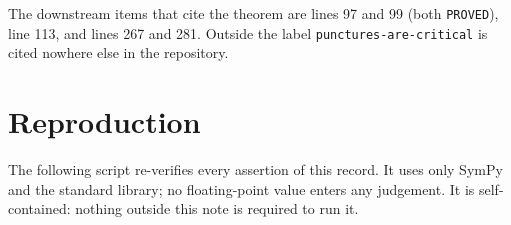 \documentclass[11pt]{article}
\begin{document}
The downstream items that cite the theorem are
 lines 97 and 99 (both
\texttt{PROVED}), line 113, and
 lines 267 and 281.
Outside  the label
\texttt{punctures-are-critical} is cited nowhere else in the repository.

\section{Reproduction}
\label{sec:script}

The following script re-verifies every assertion of this record. It uses only
SymPy and the standard library; no floating-point value enters any judgement. It
is self-contained: nothing outside this note is required to run it.
\end{document}
